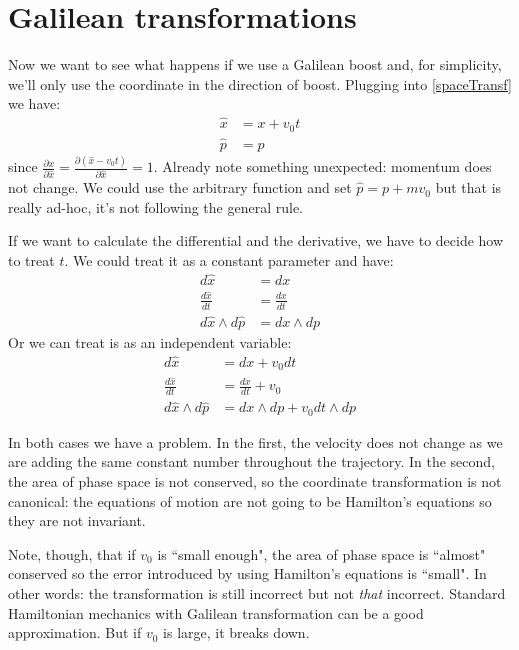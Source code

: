 \documentclass[aps,pra,10pt,floatfix,nofootinbib]{revtex4-1}
\theoremstyle{definition}
\begin{document}
\section{Galilean transformations}
Now we want to see what happens if we use a Galilean boost and, for simplicity, we'll only use the coordinate in the direction of boost. Plugging into \eqref{spaceTransf} we have:
\begin{equation}
\begin{aligned}
\hat{x} &= x + v_0 t \\
\hat{p} &= p
\end{aligned}
\label{galTransf}
\end{equation}
since $\frac{\partial x}{\partial \hat{x}} = \frac{\partial (\hat{x} - v_0 t)}{\partial \hat{x}} = 1$. Already note something unexpected: momentum does not change. We could use the arbitrary function and set $\hat{p} = p + m v_0$ but that is really ad-hoc, it's not following the general rule.

If we want to calculate the differential and the derivative, we have to decide how to treat $t$. We could treat it as a constant parameter and have:
\begin{equation}
\begin{aligned}
d\hat{x} &= dx \\
\frac{d\hat{x}}{dt} &= \frac{dx}{dt} \\
d\hat{x}\wedge d\hat{p} &= dx \wedge dp
\end{aligned}
\label{timeParameter}
\end{equation}
Or we can treat is as an independent variable:
\begin{equation}
\begin{aligned}
d\hat{x} &= dx + v_0 dt \\
\frac{d\hat{x}}{dt} &= \frac{dx}{dt} + v_0 \\
d\hat{x}\wedge d\hat{p} &= dx \wedge dp + v_0 dt \wedge dp
\end{aligned}
\label{timeParameter}
\end{equation}

In both cases we have a problem. In the first, the velocity does not change as we are adding the same constant number throughout the trajectory. In the second, the area of phase space is not conserved, so the coordinate transformation is not canonical: the equations of motion are not going to be Hamilton's equations so they are not invariant.

Note, though, that if $v_0$ is ``small enough", the area of phase space is ``almost" conserved so the error introduced by using Hamilton's equations is ``small". In other words: the transformation is still incorrect but not \emph{that} incorrect. Standard Hamiltonian mechanics with Galilean transformation can be a good approximation. But if $v_0$ is large, it breaks down.
\end{document}
